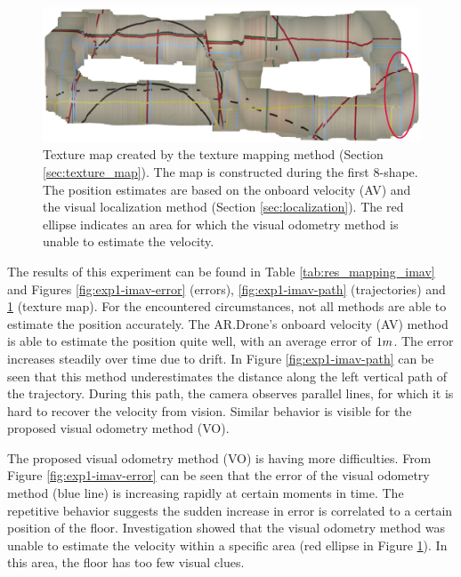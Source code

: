 \begin{figure}[htb!]
\centering
\includegraphics[width=0.75\linewidth]{images/exp1-imav-map.png}
\caption{Texture map created by the texture mapping method (Section \ref{sec:texture_map}). The map is constructed during the first 8-shape. The position estimates are based on the onboard velocity (AV) and the visual localization method (Section \ref{sec:localization}). The red ellipse indicates an area for which the visual odometry method is unable to estimate the velocity.}
\label{fig:exp1-imav-map}
\end{figure}

The results of this experiment can be found in Table \ref{tab:res_mapping_imav} and Figures \ref{fig:exp1-imav-error} (errors), \ref{fig:exp1-imav-path} (trajectories) and \ref{fig:exp1-imav-map} (texture map).
For the encountered circumstances, not all methods are able to estimate the position accurately.
The AR.Drone's onboard velocity (AV) method is able to estimate the position quite well, with an average error of $1\small{m}$.
The error increases steadily over time due to drift.
In Figure \ref{fig:exp1-imav-path} can be seen that this method underestimates the distance along the left vertical path of the trajectory.
During this path, the camera observes parallel lines, for which it is hard to recover the velocity from vision.
Similar behavior is visible for the proposed visual odometry method (VO).

The proposed visual odometry method (VO) is having more difficulties.
From Figure \ref{fig:exp1-imav-error} can be seen that the error of the visual odometry method (blue line) is increasing rapidly at certain moments in time.
The repetitive behavior suggests the sudden increase in error is correlated to a certain position of the floor.
Investigation showed that the visual odometry method was unable to estimate the velocity within a specific area (red ellipse in Figure \ref{fig:exp1-imav-map}).
In this area, the floor has too few visual clues.

